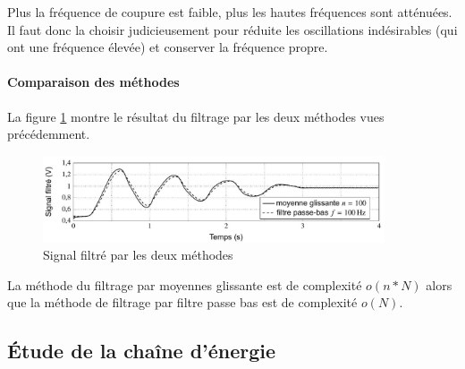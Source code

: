 \fi


\ifprof
\begin{texteCache}

 Plus la fréquence de coupure est faible, plus les hautes fréquences
  sont atténuées. Il faut donc la choisir judicieusement pour réduite
  les oscillations indésirables (qui ont une fréquence élevée) et
  conserver la fréquence propre.
  \vspace{2cm}
\end{texteCache}
\else


\paragraph{Comparaison des méthodes}

La figure \ref{fig13} montre le résultat du filtrage par les deux méthodes vues précédemment.

\begin{figure}[!htb]
\begin{center}
\includegraphics[width=0.9\textwidth]{images/2023_10_30_d11e80da56f59e3b3cdfg-10}
\caption{Signal filtré par les deux méthodes \label{fig13}}
\end{center}
\end{figure}

\fi


\ifprof
\begin{texteCache}

 La méthode du filtrage par moyennes glissante est de complexité
  \(o(n*N)\) alors que la méthode de filtrage par filtre passe bas est
  de complexité \(o(N)\).

\end{texteCache}
\else





\subsection{Étude de la chaîne d'énergie}

